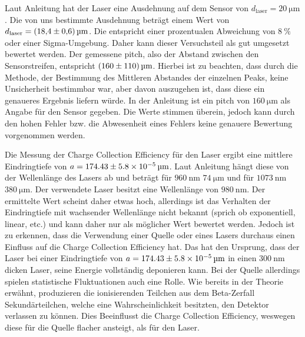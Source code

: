 Laut Anleitung hat der Laser eine Ausdehnung auf dem Sensor von 
$d_\text{laser} = \SI{20}{\micro\metre}$. Die von uns bestimmte Ausdehnung 
beträgt einem Wert von $d_\text{laser} = \SI{18.4 \pm 0.6}{\micro\metre}$. 
Die entspricht einer prozentualen Abweichung von $\SI{8}{\percent}$ oder 
einer Sigma-Umgebung. Daher kann dieser Versuchsteil als gut umgesetzt 
bewertet werden. Der gemessene pitch, also der Abstand 
zwischen den Sensorstreifen, entspricht
$\SI{160 \pm 110}{\micro\metre}$. Hierbei ist zu beachten, dass durch die Methode, 
der Bestimmung des Mittleren Abstandes der einzelnen Peaks, keine Unsicherheit 
bestimmbar war, aber davon auszugehen ist, dass diese ein genaueres 
Ergebnis liefern würde. In der Anleitung ist ein 
pitch von $\SI{160}{\micro\metre}$ als Angabe für den Sensor gegeben. Die Werte 
stimmen überein, jedoch kann durch den hohen Fehler bzw. die Abwesenheit eines 
Fehlers keine genauere Bewertung vorgenommen werden. \par \medskip 

Die Messung der Charge Collection Efficiency für den Laser ergibt eine 
mittlere Eindringtiefe von $a = \SI[parse-numbers=false]{174.43 \pm 5.8 \times 10^{-5}}{\micro\meter}$.
Laut Anleitung hängt diese von der Wellenlänge des Lasers ab und beträgt 
für $\SI{960}{\nano\meter}$ $\SI{74}{\micro\meter}$ und für 
$\SI{1073}{\nano\meter}$ $\SI{380}{\micro\meter}$. Der verwendete Laser besitzt 
eine Wellenlänge von $\SI{980}{\nano\meter}$. Der ermittelte Wert scheint daher 
etwas hoch, allerdings ist das Verhalten der Eindringtiefe mit wachsender 
Wellenlänge nicht bekannt (sprich ob exponentiell, linear, etc.) und kann daher 
nur als möglicher Wert bewertet werden. Jedoch ist zu erkennen, dass die Verwendung 
einer Quelle oder eines Lasers durchaus einen Einfluss auf die Charge Collection 
Efficiency hat. Das hat den Ursprung, dass der Laser bei einer 
Eindringtiefe von $a = \SI[parse-numbers=false]{174.43 \pm 5.8 \times 10^{-5}}{\micro\meter}$ 
in einen $\SI{300}{\nano\meter}$ dicken Laser, seine Energie vollständig 
deponieren kann. Bei der Quelle allerdings spielen statistische Fluktuationen 
auch eine Rolle. Wie bereits in der Theorie erwähnt, produzieren die ionisierenden 
Teilchen aus dem Beta-Zerfall Sekundärteilchen, welche eine Wahrscheinlichkeit 
besitzten, den Detektor verlassen zu können. Dies Beeinflusst die Charge Collection 
Efficiency, weswegen diese für die Quelle flacher ansteigt, als für den Laser. \par \medskip 

